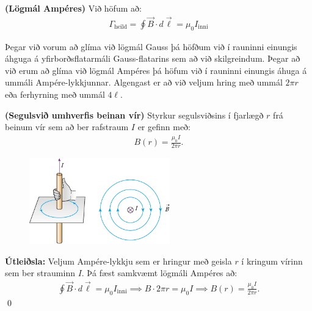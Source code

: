 \begin{tcolorbox}
\begin{theorem}
\textbf{(Lögmál Ampéres)}  Við höfum að:
\begin{align*}
    \Gamma_{\text{heild}} = \oint \vec{B} \cdot d\vec{\ell} = \mu_0 I_{\text{inni}}
\end{align*}
\end{theorem}
\end{tcolorbox}

Þegar við vorum að glíma við lögmál Gauss þá höfðum við í rauninni einungis áhguga á yfirborðsflatarmáli Gauss-flatarins sem að við skilgreindum. Þegar að við erum að glíma við lögmál Ampéres þá höfum við í rauninni einungis áhuga á ummáli Ampére-lykkjunnar. Algengast er að við veljum hring með ummál $2\pi r$ eða ferhyrning með ummál $4\ell$.

\begin{tcolorbox}
\begin{theorem}
\textbf{(Segulsvið umhverfis beinan vír)} Styrkur segulsviðsins í fjarlægð $r$ frá beinum vír sem að ber rafstraum $I$ er gefinn með:
\begin{align*}
    B(r) = \frac{\mu_0 I}{2\pi r}.
\end{align*}
\end{theorem}
\end{tcolorbox}

\begin{minipage}{\linewidth}

\begin{figure}
\vspace{-0.5cm}
\includegraphics[width = 2.4in]{figures/ampere2.pdf}
\end{figure}

\textbf{Útleiðsla:} Veljum Ampére-lykkju sem er hringur með geisla $r$ í kringum vírinn sem ber strauminn $I$. Þá fæst samkvæmt lögmáli Ampéres að:
\begin{align*}
    \oint \vec{B} \cdot d\vec{\ell} = \mu_0 I_{\text{inni}} \implies B \cdot 2\pi r = \mu_0 I \implies B(r) = \frac{\mu_0 I}{2\pi r}.
\end{align*}
\qed
\end{minipage}

